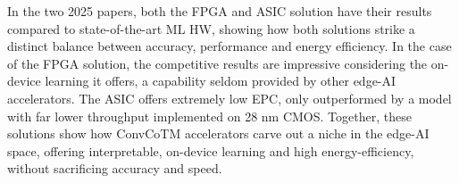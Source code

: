 In the two 2025 papers, both the FPGA and ASIC solution have their results compared to state-of-the-art ML HW, showing how both solutions strike a distinct balance between accuracy, performance and energy efficiency. In the case of the FPGA solution, the competitive results are impressive considering the on-device learning it offers, a capability seldom provided by other edge-AI accelerators. The ASIC offers extremely low EPC, only outperformed by a model with far lower throughput implemented on 28 nm CMOS. Together, these solutions show how ConvCoTM accelerators carve out a niche in the edge-AI space, offering interpretable, on-device learning and high energy-efficiency, without sacrificing accuracy and speed.